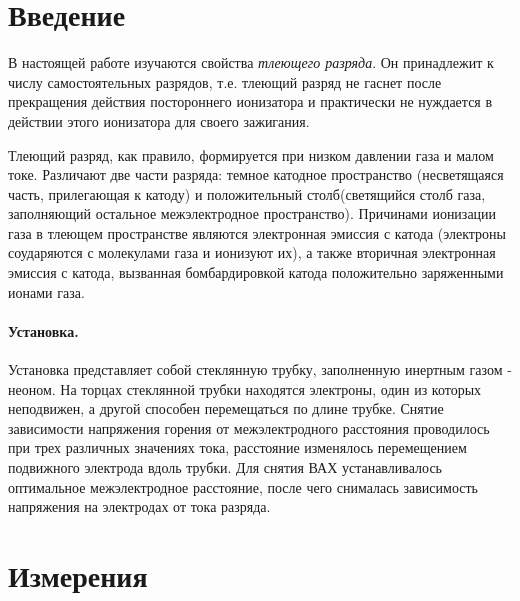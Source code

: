 \documentclass[a5paper,11pt]{extarticle}
\begin{document}


\tableofcontents
\newpage



\section*{Введение}
\vspace{-0.5em}
В настоящей работе изучаются свойства \textit{тлеющего разряда}. Он принадлежит к числу самостоятельных разрядов, т.е. тлеющий разряд не гаснет после прекращения действия постороннего ионизатора и практически не нуждается в действии этого ионизатора для своего зажигания.

Тлеющий разряд, как правило, формируется при низком давлении газа и малом токе. Различают две части разряда: темное катодное пространство (несветящаяся часть, прилегающая к катоду) и положительный столб(светящийся столб газа, заполняющий остальное межэлектродное пространство). 
Причинами ионизации газа в тлеющем пространстве являются электронная эмиссия с катода (электроны соударяются с молекулами газа и ионизуют их), а также вторичная электронная эмиссия с катода, вызванная бомбардировкой катода положительно заряженными ионами газа.



\vspace{-0.5em}

\paragraph{Установка.} Установка представляет собой стеклянную трубку, заполненную инертным газом - неоном. На торцах стеклянной трубки находятся электроны, один из которых неподвижен, а другой способен перемещаться по длине трубке.
Снятие зависимости напряжения горения от межэлектродного расстояния проводилось при трех различных значениях тока, расстояние изменялось перемещением подвижного электрода вдоль трубки.
Для снятия ВАХ устанавливалось оптимальное межэлектродное расстояние, после чего снималась зависимость напряжения на электродах от тока разряда.

\newpage


\section{Измерения}
\end{document}

